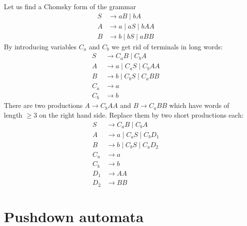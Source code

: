\begin{page}
\setcounter{section}{5}
\setcounter{subsection}{2}
\setcounter{dfn}{11}
\label{portion:1106}

\begin{exl}
Let us find a Chomsky form of the grammar
\begin{align*}
S &\to aB \mid bA\\
A &\to a \mid aS \mid bAA\\
B &\to b \mid bS \mid aBB
\end{align*}
By introducing variables $C_a$ and $C_b$ we get rid of terminals in long words:
\begin{align*}
S &\to C_aB \mid C_bA\\
A &\to a \mid C_aS \mid C_bAA\\
B &\to b \mid C_bS \mid C_aBB\\
C_a &\to a\\
C_b &\to b
\end{align*}
There are two productions $A \to C_bAA$ and $B \to C_aBB$ which have words of length $\ge 3$ on the right hand side.
Replace them by two short productions each:
\begin{align*}
S &\to C_aB \mid C_bA\\
A &\to a \mid C_aS \mid C_bD_1\\
B &\to b \mid C_bS \mid C_aD_2\\
C_a &\to a\\
C_b &\to b\\
D_1 &\to AA\\
D_2 &\to BB
\end{align*}
\end{exl}

\end{page}

\begin{page}
\setcounter{section}{6}
\setcounter{subsection}{1}
\setcounter{dfn}{0}
\label{portion:1108}

\section{Pushdown automata}

\end{page}

